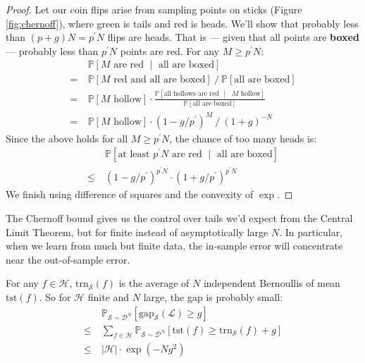 \documentclass[twocolumn]{article}
\newcommand{\PP}{\mathbb{P}}
\newcommand{\Dd}{\mathcal{D}}
\newcommand{\Ee}{\mathcal{E}}
\newcommand{\Hh}{\mathcal{H}}
\newcommand{\Ll}{\mathcal{L}}
\newcommand{\Ss}{\mathcal{S}}
\newcommand{\Uu}{\mathcal{U}}
\newcommand{\Ein} {\text{trn}_{\Ss}} %
\newcommand{\Egap}{\text{gap}_{\Ss}}
\newcommand{\Eout}{\text{tst}} %
\theoremstyle{definition}
\begin{document}
\begin{proof}
                Let our coin flips arise from sampling points on sticks
                (Figure \ref{fig:chernoff}), where green is tails and red
                is heads.
                We'll show that probably less than $(p+g)N = p^\prime N$ flips
                are heads.  That is --- given that all points are
                \textbf{boxed} --- probably less than $p^\prime N$ points are
                red. 
                For any $M\geq p^\prime N$:
                {\small 
                \begin{align*}
                        & ~ \PP[\text{$M$ are red $\mid$ all are boxed}] \\
                      = & ~ \PP[\text{$M$ red and all are boxed}] ~/~ \PP[\text{all are boxed}]  \\
                      = & ~ \PP[\text{$M$ hollow}] \cdot
                            \frac{\PP[\text{all hollows are red $\mid$ $M$ hollow}]}{\PP[\text{all are boxed}]} \\
                      = & ~ \PP[\text{$M$ hollow}] \cdot (1 - g/p^\prime)^{M} ~/~ (1+g)^{-N} 
                \end{align*}
                }
                Since the above holds for all $M\geq p^\prime N$, the chance of too many
                heads is:
                \begin{align*}
                    &~\PP[\text{at least $p^\prime N$ are red $\mid$ all are boxed}] \\
                    \leq
                    &~(1 - g/p^\prime)^{p^\prime N} \cdot (1 + g/p^\prime)^{p^\prime N}
                \end{align*}
                We finish using difference of squares and the convexity of
                $\exp$.
        \end{proof}

        The Chernoff bound gives us the control over tails we'd expect from the
        Central Limit Theorem, but for finite instead of asymptotically large
        $N$.  In particular, when we learn from much but finite data, the
        in-sample error will concentrate near the out-of-sample error.

        For any $f\in \Hh$, $\Ein(f)$ is the average of $N$ independent 
        Bernoullis of mean $\Eout(f)$.  So for $\Hh$ finite and $N$
        large, the gap is probably small:
        \begin{align*}
            &~\PP_{\Ss\sim \Dd^N}[\Egap(\Ll) \geq g] \\
            \leq 
            &~\sum_{f\in \Hh} \PP_{\Ss\sim \Dd^N}[\Eout(f) \geq \Ein(f) + g] \\
            \leq
            &~|\Hh| \cdot \exp(-Ng^2)
        \end{align*}
\end{document}
